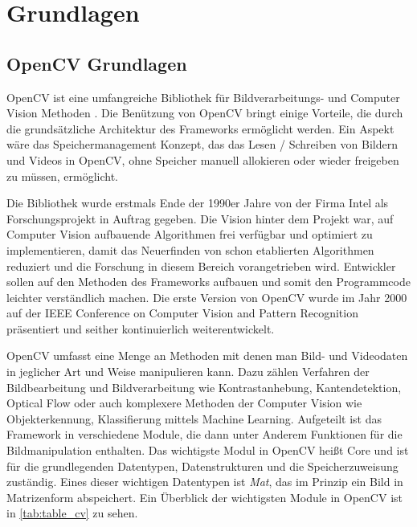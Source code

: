 \chapter{Grundlagen}
\label{cha:Grundlagen}

\section{OpenCV Grundlagen}
OpenCV ist eine umfangreiche Bibliothek für Bildverarbeitungs- und Computer Vision Methoden \cite{IntroToOpenCV} \cite{OpenCVPython}. Die Benützung von OpenCV bringt einige Vorteile, die durch die grundsätzliche Architektur des Frameworks ermöglicht werden. Ein Aspekt wäre das Speichermanagement Konzept, das das Lesen / Schreiben von Bildern und Videos in OpenCV, ohne Speicher manuell allokieren oder wieder freigeben zu müssen, ermöglicht.\par
Die Bibliothek wurde erstmals Ende der 1990er Jahre von der Firma Intel als Forschungsprojekt in Auftrag gegeben. Die Vision hinter dem Projekt war, auf Computer Vision aufbauende Algorithmen frei verfügbar und optimiert zu implementieren, damit das Neuerfinden von schon etablierten Algorithmen reduziert und die Forschung in diesem Bereich vorangetrieben wird. Entwickler sollen auf den Methoden des Frameworks aufbauen und somit den Programmcode leichter verständlich machen. Die erste Version von OpenCV wurde im Jahr 2000 auf der IEEE Conference on Computer Vision and Pattern Recognition präsentiert und seither kontinuierlich weiterentwickelt.\par
OpenCV umfasst eine Menge an Methoden mit denen man Bild- und Videodaten in jeglicher Art und Weise manipulieren kann. Dazu zählen Verfahren der Bildbearbeitung und Bildverarbeitung wie Kontrastanhebung, Kantendetektion, Optical Flow oder auch komplexere Methoden der Computer Vision wie Objekterkennung, Klassifierung mittels Machine Learning. Aufgeteilt ist das Framework in verschiedene Module, die dann unter Anderem Funktionen für die Bildmanipulation enthalten. Das wichtigste Modul in OpenCV heißt Core und ist für die grundlegenden Datentypen, Datenstrukturen und die Speicherzuweisung zuständig. Eines dieser wichtigen Datentypen ist \textit{Mat}, das im Prinzip ein Bild in Matrizenform abspeichert. Ein Überblick der wichtigsten Module in OpenCV ist in \autoref{tab:table_cv} zu sehen.
\newpage
